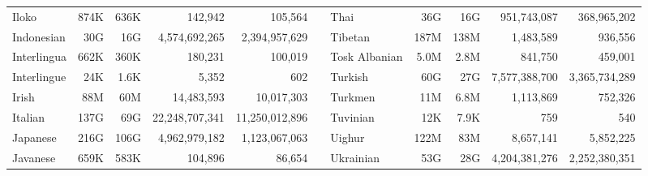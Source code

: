 \begin{table*}[t!]
{\begin{tabular}{@{}lrrrrclrrrr@{}}
            Iloko                     & 874K                     & 636K                      & 142,942                  & 105,564                   &                          & Thai                      & 36G                      & 16G                       & 951,743,087              & 368,965,202               \\
            Indonesian                & 30G                      & 16G                       & 4,574,692,265            & 2,394,957,629             &                          & Tibetan                   & 187M                     & 138M                      & 1,483,589                & 936,556                   \\
            Interlingua               & 662K                     & 360K                      & 180,231                  & 100,019                   &                          & Tosk Albanian             & 5.0M                     & 2.8M                      & 841,750                  & 459,001                   \\
            Interlingue               & 24K                      & 1.6K                      & 5,352                    & 602                       &                          & Turkish                   & 60G                      & 27G                       & 7,577,388,700            & 3,365,734,289             \\
            Irish                     & 88M                      & 60M                       & 14,483,593               & 10,017,303                &                          & Turkmen                   & 11M                      & 6.8M                      & 1,113,869                & 752,326                   \\
            Italian                   & 137G                     & 69G                       & 22,248,707,341           & 11,250,012,896            &                          & Tuvinian                  & 12K                      & 7.9K                      & 759                      & 540                       \\
            Japanese                  & 216G                     & 106G                      & 4,962,979,182            & 1,123,067,063             &                          & Uighur                    & 122M                     & 83M                       & 8,657,141                & 5,852,225                 \\
            Javanese                  & 659K                     & 583K                      & 104,896                  & 86,654                    &                          & Ukrainian                 & 53G                      & 28G                       & 4,204,381,276            & 2,252,380,351             \\

\end{tabular}}
\end{table*}
